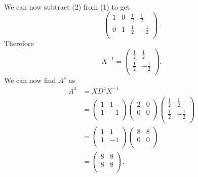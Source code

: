 We can now subtract (2) from (1) to get
\[ 
\left( \begin{array}{cc|cc}
1 & 0 & \frac{1}{2} & \frac{1}{2} \\
0 & 1 & \frac{1}{2} & -\frac{1}{2}\\
\end{array} \right)
.\]
Therefore
\[ 
X^{-1} = \begin{pmatrix}
\frac{1}{2} & \frac{1}{2}\\
\frac{1}{2} & -\frac{1}{2}\\
\end{pmatrix}
.\]
We can now find $A^{4}$ as
\begin{align*}
  A^{4} &= XD^{4}X^{-1} \\
  &= \begin{pmatrix}
  1 & 1\\
  1 & -1\\
  \end{pmatrix} \begin{pmatrix}
  2 & 0\\
  0 & 0\\
  \end{pmatrix} \begin{pmatrix}
  \frac{1}{2} & \frac{1}{2}\\
  \frac{1}{2} & -\frac{1}{2}\\
  \end{pmatrix} \\
  &= \begin{pmatrix}
  1 & 1\\
  1 & -1\\
  \end{pmatrix} \begin{pmatrix}
  8 & 8\\
  0 & 0\\
  \end{pmatrix} \\
  &= \begin{pmatrix}
  8 & 8\\
  8 & 8\\
  \end{pmatrix}
.\end{align*}


